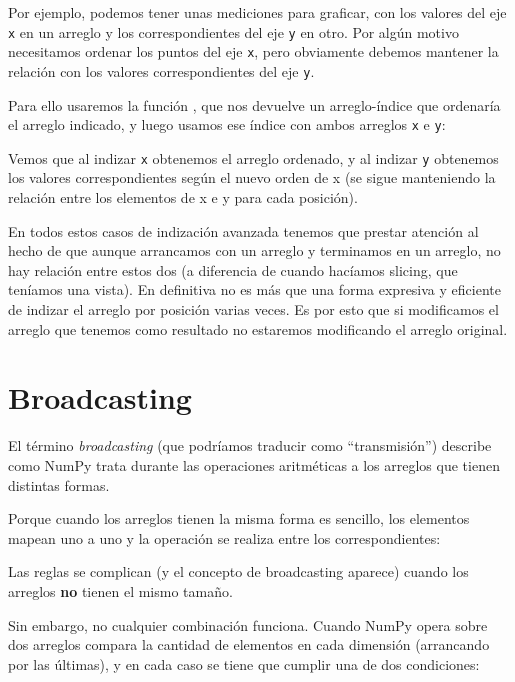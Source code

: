 Por ejemplo, podemos tener unas mediciones para graficar, con los valores del eje \verb|x| en un arreglo y los correspondientes del eje \verb|y| en otro. Por algún motivo necesitamos ordenar los puntos del eje \verb|x|, pero obviamente debemos mantener la relación con los valores correspondientes del eje \verb|y|.

Para ello usaremos la función , que nos devuelve un arreglo-índice que ordenaría el arreglo indicado, y luego usamos ese índice con ambos arreglos \verb|x| e \verb|y|:


Vemos que al indizar \verb|x| obtenemos el arreglo ordenado, y al indizar \verb|y| obtenemos los valores correspondientes según el nuevo orden de x (se sigue manteniendo la relación entre los elementos de x e y para cada posición).

En todos estos casos de indización avanzada tenemos que prestar atención al hecho de que aunque arrancamos con un arreglo y terminamos en un arreglo, no hay relación entre estos dos (a diferencia de cuando hacíamos slicing, que teníamos una vista). En definitiva no es más que una forma expresiva y eficiente de indizar el arreglo por posición varias veces. Es por esto que si modificamos el arreglo que tenemos como resultado no estaremos modificando el arreglo original.

\section{Broadcasting}

El término \textit{broadcasting} (que podríamos traducir como ``transmisión'') describe como NumPy trata durante las operaciones aritméticas a los arreglos que tienen distintas formas.

Porque cuando los arreglos tienen la misma forma es sencillo, los elementos mapean uno a uno y la operación se realiza entre los correspondientes:


Las reglas se complican (y el concepto de broadcasting aparece) cuando los arreglos \textbf{no} tienen el mismo tamaño.

Sin embargo, no cualquier combinación funciona. Cuando NumPy opera sobre dos arreglos compara la cantidad de elementos en cada dimensión (arrancando por las últimas), y en cada caso se tiene que cumplir una de dos condiciones:


